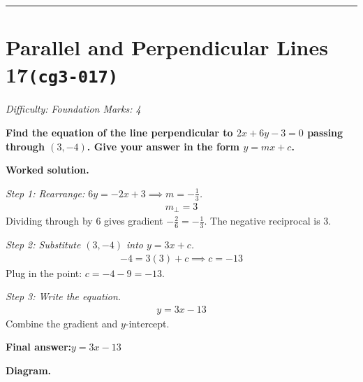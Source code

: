 \documentclass[11pt]{article}
\newcommand{\question}[1]{\par\medskip\noindent\textbf{#1}\par}
\begin{document}
\medskip\hrule

\section*{Parallel and Perpendicular Lines 17\quad\small\texttt{(cg3-017)}}
\textit{Difficulty: Foundation \quad\textbar\quad Marks: 4}

\question{Find the equation of the line perpendicular to \( 2x + 6y - 3 = 0 \) passing through \( (3, -4) \). Give your answer in the form \( y = mx + c \).}

\textbf{Worked solution.}

\textit{Step 1: Rearrange: \( 6y = -2x + 3 \implies m = -\frac{1}{3} \).}
\[\begin{gathered}
m_\perp = 3
\end{gathered}\]
Dividing through by \( 6 \) gives gradient \( -\tfrac{2}{6} = -\tfrac{1}{3} \). The negative reciprocal is \( 3 \).

\textit{Step 2: Substitute \( (3, -4) \) into \( y = 3x + c \).}
\[\begin{gathered}
-4 = 3(3) + c \implies c = -13
\end{gathered}\]
Plug in the point: \( c = -4 - 9 = -13 \).

\textit{Step 3: Write the equation.}
\[\begin{gathered}
y = 3x - 13
\end{gathered}\]
Combine the gradient and \( y \)-intercept.

\begin{answerbox}
\textbf{Final answer:}\quad \(\displaystyle y = 3x - 13\)
\end{answerbox}
\textbf{Diagram.}
\end{document}
